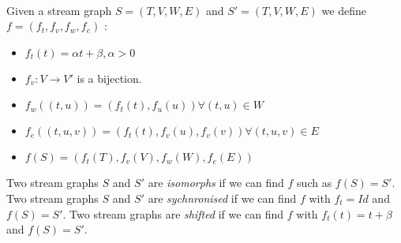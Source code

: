 \documentclass[dvipsnames,a4paper,11pt]{article}
\begin{document}
    \paragraph{}
    Given a stream graph $S=(T,V,W,E)$ and $S'=(T,V,W,E)$ we define $f=(f_t,f_v,f_w,f_e)$ :
    \begin{itemize}
    	\item $f_t(t)=\alpha t + \beta, \alpha > 0$
    	\item $f_v:V\rightarrow V'$ is a bijection.
    	\item $f_w((t,u))=(f_t(t),f_u(u)) \forall (t,u) \in W$
    	\item $f_e((t,u,v))=(f_t(t),f_v(u),f_v(v)) \forall (t,u,v) \in E$
    	\item $f(S)=(f_t(T),f_v(V),f_w(W),f_e(E))$
    \end{itemize}
    
    Two stream graphs $S$ and $S'$ are {\em isomorphs } if we can find $f$ such as $f(S)=S'$.
    Two stream graphs $S$ and $S'$ are {\em sychnronised} if we can find $f$ with $f_t=Id$ and $f(S)=S'$.
    Two stream graphs are {\em shifted} if we can find $f$ with $f_t(t)=t+\beta$ and $f(S)=S'$.
\end{document}

